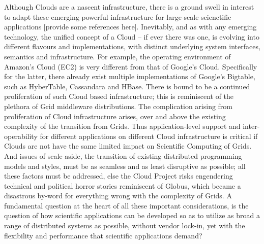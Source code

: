 \documentclass[conference,final]{IEEEtran}
\begin{document}
Although Clouds are a nascent infrastructure, there is a ground swell
in interest to adapt these emerging powerful infrastructure for
large-scale scienctific applications [provide some references here].
Inevitably, and as with any emerging technology, the unified concept
of a Cloud -- if ever there was one, is evolving into different
flavours and implementations, with distinct underlying system
interfaces, semantics and infrastructure. For example, the operating
environment of Amazon's Cloud (EC2) is very different from that of
Google's Cloud. Specifically for the latter, there already exist
multiple implementations of Google's Bigtable, such as HyberTable,
Cassandara and HBase. There is bound to be a continued proliferation
of such Cloud based infrastructure; this is reminiscent of the
plethora of Grid middleware distributions. The complication arising
from proliferation of Cloud infrastructure arises, over and above the
existing complexity of the transition from Grids. Thus
application-level support and inter-operability for different
applications on different Cloud infrastructure is critical if Clouds
are not have the same limited impact on Scientific Computing of
Grids. And issues of scale aside, the transition of existing
distributed programming models and styles, must be as seamless and as
least disruptive as possible; all these factors must be addressed,
else the Cloud Project risks engendering technical and political
horror stories reminiscent of Globus, which became a disastrous
by-word for everything wrong with the complexity of Grids.  A
fundamental question at the heart of all these important
considerations, is the question of how scientific applications can be
developed so as to utilize as broad a range of distributed systems as
possible, without vendor lock-in, yet with the flexibility and
performance that scientific applications demand?
\end{document}
